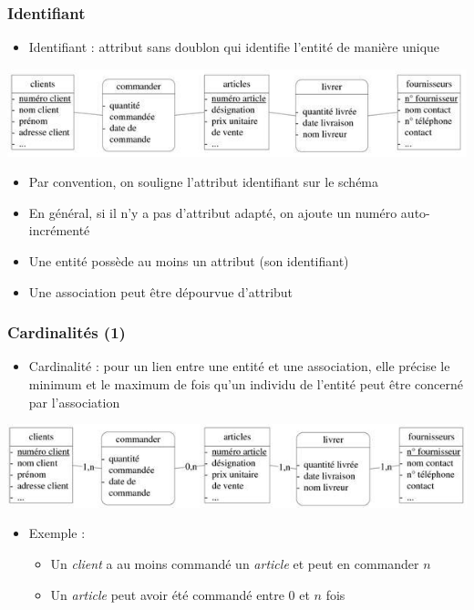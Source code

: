 \begin{frame}
  \frametitle{Identifiant}
  \begin{itemize}
    \item Identifiant : attribut sans doublon qui identifie l'entité de manière unique
  \end{itemize}
  \begin{center}
    \includegraphics[width=0.9\linewidth]{identifiant.jpg}
  \end{center}
  \begin{itemize}
    \item Par convention, on souligne l'attribut identifiant sur le schéma
    \item En général, si il n'y a pas d'attribut adapté, on ajoute un numéro auto-incrémenté
    \item Une entité possède au moins un attribut (son identifiant)
    \item Une association peut être dépourvue d'attribut
  \end{itemize}
\end{frame}


\begin{frame}
  \frametitle{Cardinalités (1)}
  \begin{itemize}
    \item Cardinalité : pour un lien entre une entité et une association, elle précise le minimum et le maximum de
      fois qu'un individu de l'entité peut être concerné par l'association
  \end{itemize}
  \begin{center}
    \includegraphics[width=0.9\linewidth]{cardinalites.jpg}
  \end{center}
  \begin{itemize}
    \item Exemple :
      \begin{itemize}
        \item Un \emph{client} a au moins commandé un \emph{article} et peut en commander $n$
        \item Un \emph{article} peut avoir été commandé entre $0$ et $n$ fois
      \end{itemize}
  \end{itemize}
\end{frame}

